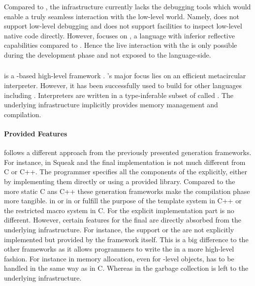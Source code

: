 Compared to \Maxine, the \B infrastructure currently lacks the debugging tools which would enable a truly seamless interaction with the low-level world.
Namely, \B does not support low-level debugging and does not support facilities to inspect low-level native code directly.
However, \Maxine focuses on \Java, a language with inferior reflective capabilities compared to \PH.
Hence the live interaction with the \VM is only possible during the development phase and not exposed to the language-side.


\subsubsection*{\PyPy}
 is a \Python-based high-level \VM framework \cite{Rigo06a}.
\PyPy's major focus lies on an efficient metacircular \Python interpreter.
However, it has been successfully used to build \VMs for other languages including \ST \cite{Bolz08a}.
Interpreters are written in a type-inferable subset of \Python called \RPython.
The underlying \PyPy infrastructure implicitly provides memory management and \JIT compilation.

\paragraph{Provided \VM Features}
\PyPy follows a different approach from the previously presented \VM generation frameworks.
For instance, in Squeak and \Jikes the final \VM implementation is not much different from C or C++.
The programmer specifies all the components of the \VM explicitly, either by implementing them directly or using a provided library.
Compared to the more static C ans C++ these \VM generation frameworks make the compilation phase more tangible.
\ST in \Squeak or \Java in \Jikes or \Maxine fulfill the purpose of the template system in C++ or the restricted macro system in C.
For the explicit implementation part \PyPy is no different.
However, certain features for the final \VM are directly absorbed from the underlying \PyPy infrastructure.
For instance, the \JIT support or the \GC are not explicitly implemented but provided by the \PyPy framework itself.
This is a big difference to the other \VM frameworks as it allows programmers to write the \VM in a more high-level fashion.
For instance in \Squeak memory allocation, even for \VM-level objects, has to be handled in the same way as in C.
Whereas in \PyPy the garbage collection is left to the underlying infrastructure.

